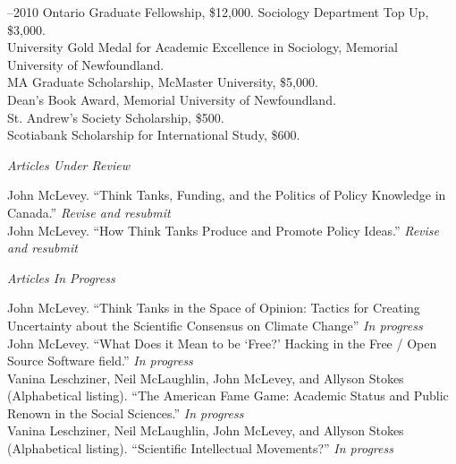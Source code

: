 \documentclass[11pt,usenames,dvipsnames]{article}
\begin{document}
–2010 Ontario Graduate Fellowship, \$12,000. Sociology Department Top Up, \$3,000.\\

 University Gold Medal for Academic Excellence in Sociology, Memorial University of Newfoundland.\\

 MA Graduate Scholarship, McMaster University, \$5,000.\\

 Dean's Book Award, Memorial University of Newfoundland.\\

 St. Andrew’s Society Scholarship, \$500.\\

 Scotiabank Scholarship for International Study, \$600.\\



\noindent\emph{Articles Under Review \vspace{0.01in}}

\ind John McLevey. ``Think Tanks, Funding, and the Politics of Policy Knowledge in Canada.'' \emph{Revise and resubmit}\\

\ind John McLevey. ``How Think Tanks Produce and Promote Policy Ideas.'' \emph{Revise and resubmit}\\


\noindent\emph{Articles In Progress \vspace{0.01in}}

\ind John McLevey. ``Think Tanks in the Space of Opinion: Tactics for Creating Uncertainty about the Scientific Consensus on Climate Change'' \emph{In progress} \\

\ind John McLevey. ``What Does it Mean to be `Free?' Hacking in the Free / Open Source Software field.'' \emph{In progress} \\

\ind Vanina Leschziner, Neil McLaughlin, John McLevey, and Allyson Stokes (Alphabetical listing). ``The American Fame Game: Academic Status and Public Renown in the Social Sciences.'' \emph{In progress} \\

\ind Vanina Leschziner, Neil McLaughlin, John McLevey, and Allyson Stokes (Alphabetical listing). ``Scientific Intellectual Movements?'' \emph{In progress} \\
\end{document}
